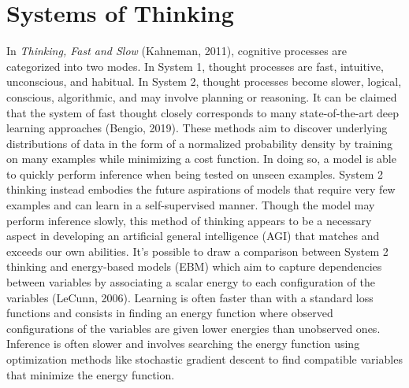 \documentclass{article}
\begin{document}
\section{Systems of Thinking}

In \textit{Thinking, Fast and Slow} (Kahneman, 2011), cognitive processes are categorized into two modes. In System 1, thought processes are fast, intuitive, unconscious, and habitual. In System 2, thought processes become slower, logical, conscious, algorithmic, and may involve planning or reasoning. It can be claimed that the system of fast thought closely corresponds to many state-of-the-art deep learning approaches (Bengio, 2019). These methods aim to discover underlying distributions of data in the form of a normalized probability density by training on many examples while minimizing a cost function. In doing so, a model is able to quickly perform inference when being tested on unseen examples. 
System 2 thinking instead embodies the future aspirations of models that require very few examples and can learn in a self-supervised manner. Though the model may perform inference slowly, this method of thinking appears to be a necessary aspect in developing an artificial general intelligence (AGI) that matches and exceeds our own abilities. It's possible to draw a comparison between System 2 thinking and energy-based models (EBM) which aim to capture dependencies between variables by associating a scalar energy to each configuration of the variables (LeCunn, 2006). Learning is often faster than with a standard loss functions and consists in finding an energy function where observed configurations of the variables are given lower energies than unobserved ones. Inference is often slower and involves searching the energy function using optimization methods like stochastic gradient descent to find compatible variables that minimize the energy function. 

\end{document}
